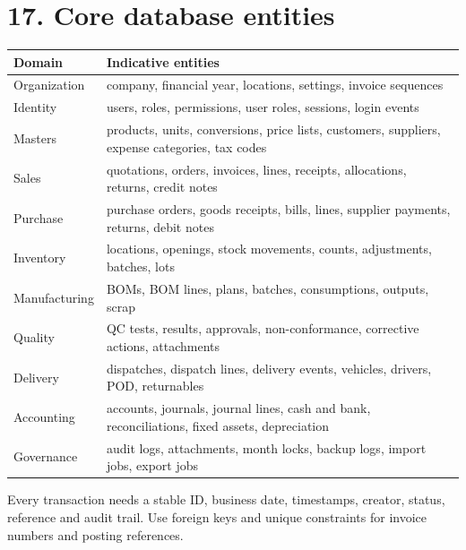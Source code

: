 \documentclass[11pt]{article}
\begin{document}
\section{17. Core database entities}
\begin{center}\small\begin{tabularx}{\linewidth}{|*{2}{>{\raggedright\arraybackslash}X|}}
\hline
\textbf{Domain} & \textbf{Indicative entities} \\
\hline
Organization & company, financial year, locations, settings, invoice sequences \\
\hline
Identity & users, roles, permissions, user roles, sessions, login events \\
\hline
Masters & products, units, conversions, price lists, customers, suppliers, expense categories, tax codes \\
\hline
Sales & quotations, orders, invoices, lines, receipts, allocations, returns, credit notes \\
\hline
Purchase & purchase orders, goods receipts, bills, lines, supplier payments, returns, debit notes \\
\hline
Inventory & locations, openings, stock movements, counts, adjustments, batches, lots \\
\hline
Manufacturing & BOMs, BOM lines, plans, batches, consumptions, outputs, scrap \\
\hline
Quality & QC tests, results, approvals, non-conformance, corrective actions, attachments \\
\hline
Delivery & dispatches, dispatch lines, delivery events, vehicles, drivers, POD, returnables \\
\hline
Accounting & accounts, journals, journal lines, cash and bank, reconciliations, fixed assets, depreciation \\
\hline
Governance & audit logs, attachments, month locks, backup logs, import jobs, export jobs \\
\hline
\end{tabularx}\end{center}
Every transaction needs a stable ID, business date, timestamps, creator, status, reference and audit trail. Use foreign keys and unique constraints for invoice numbers and posting references.
\clearpage
\end{document}
